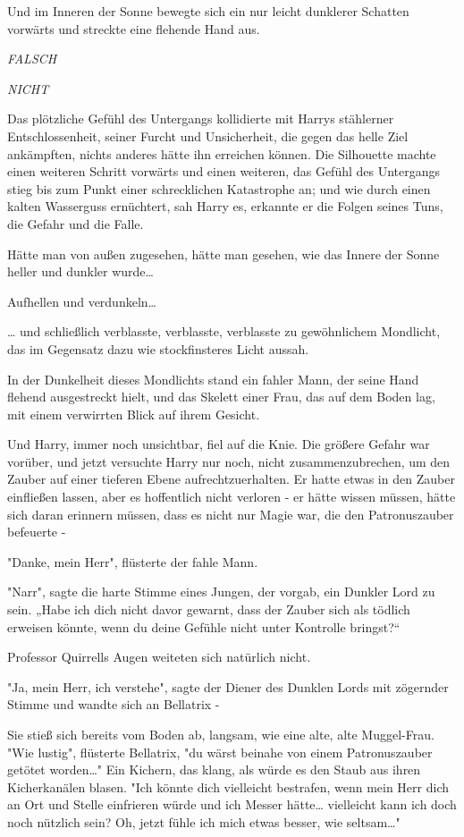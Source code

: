 {Und im Inneren der Sonne bewegte sich ein nur leicht dunklerer Schatten vorwärts und streckte eine flehende Hand aus.

\emph{\emph{FALSCH}}

\emph{\emph{NICHT}}

Das plötzliche Gefühl des Untergangs kollidierte mit Harrys stählerner Entschlossenheit, seiner Furcht und Unsicherheit, die gegen das helle Ziel ankämpften, nichts anderes hätte ihn erreichen können. Die Silhouette machte einen weiteren Schritt vorwärts und einen weiteren, das Gefühl des Untergangs stieg bis zum Punkt einer schrecklichen Katastrophe an; und wie durch einen kalten Wasserguss ernüchtert, sah Harry es, erkannte er die Folgen seines Tuns, die Gefahr und die Falle.

Hätte man von außen zugesehen, hätte man gesehen, wie das Innere der Sonne heller und dunkler wurde…

Aufhellen und verdunkeln…

… und schließlich verblasste, verblasste, verblasste zu gewöhnlichem Mondlicht, das im Gegensatz dazu wie stockfinsteres Licht aussah.

In der Dunkelheit dieses Mondlichts stand ein fahler Mann, der seine Hand flehend ausgestreckt hielt, und das Skelett einer Frau, das auf dem Boden lag, mit einem verwirrten Blick auf ihrem Gesicht.

Und Harry, immer noch unsichtbar, fiel auf die Knie. Die größere Gefahr war vorüber, und jetzt versuchte Harry nur noch, nicht zusammenzubrechen, um den Zauber auf einer tieferen Ebene aufrechtzuerhalten. Er hatte etwas in den Zauber einfließen lassen, aber es hoffentlich nicht verloren - er hätte wissen müssen, hätte sich daran erinnern müssen, dass es nicht nur Magie war, die den Patronuszauber befeuerte -

"Danke, mein Herr", flüsterte der fahle Mann.

"Narr", sagte die harte Stimme eines Jungen, der vorgab, ein Dunkler Lord zu sein. „Habe ich dich nicht davor gewarnt, dass der Zauber sich als tödlich erweisen könnte, wenn du deine Gefühle nicht unter Kontrolle bringst?“

Professor Quirrells Augen weiteten sich natürlich nicht.

"Ja, mein Herr, ich verstehe", sagte der Diener des Dunklen Lords mit zögernder Stimme und wandte sich an Bellatrix -

Sie stieß sich bereits vom Boden ab, langsam, wie eine alte, alte Muggel-Frau. "Wie lustig", flüsterte Bellatrix, "du wärst beinahe von einem Patronuszauber getötet worden…" Ein Kichern, das klang, als würde es den Staub aus ihren Kicherkanälen blasen. "Ich könnte dich vielleicht bestrafen, wenn mein Herr dich an Ort und Stelle einfrieren würde und ich Messer hätte… vielleicht kann ich doch noch nützlich sein? Oh, jetzt fühle ich mich etwas besser, wie seltsam…"

}
